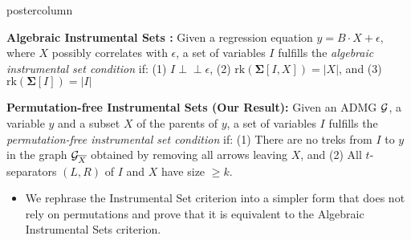 \documentclass{beamer}
\def\ci{\perp\!\!\!\!\!\perp}
\begin{document}
\begin{frame}
\begin{columns}
\begin{column}{0.33\textwidth}
\begin{beamercolorbox}[center]{postercolumn}
\begin{minipage}{.98\textwidth}
{\begin{myblock}{}
		\vspace{0.5em}
		\textbf{Algebraic Instrumental Sets \citep{bollen2012instrumental}:}
			\justifying Given a regression equation $y = B \cdot X + \epsilon$, where $X$ possibly
			correlates with $\epsilon$, a set of variables
			$I$ fulfills the \emph{algebraic instrumental set condition} if: (1) $I \ci \epsilon$,
			(2) $\textrm{rk}(\bm{\Sigma}[I,X]) = |X|$, and (3) $\textrm{rk}(\bm{\Sigma}[I]) = |I|$

		\vspace{0.5em}
		\textbf{Permutation-free Instrumental Sets (Our Result):}
			\justifying Given an ADMG $\cal G$, a variable $y$ and a subset $X$ of the parents
			of $y$, a set of variables $I$ fulfills the \emph{permutation-free
			instrumental set condition} if: (1) There are no treks from $I$ to $y$
			in the graph ${\cal G}_{\overline{X}}$ obtained by removing all arrows
			leaving $X$, and (2) All $t$-separators $(L,R)$ of $I$ and $X$ have
			size $\geq k$.
		\vspace{0.5em}	
		\begin{itemize}
			\item \justifying We rephrase the Instrumental Set
				criterion into a simpler form that does not rely
				on permutations and prove that it is
				equivalent to the Algebraic Instrumental Sets
				criterion.
		\end{itemize}


\end{myblock}}
\end{minipage}
\end{beamercolorbox}
\end{column}
\end{columns}
\end{frame}
\end{document}
